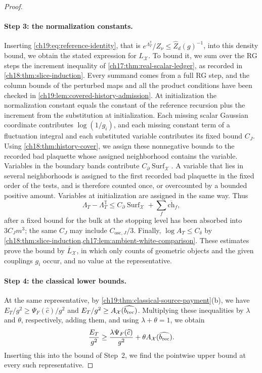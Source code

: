 \begin{proof}
\paragraph{Step 3: the normalization constants.}
Inserting \eqref{ch19:eq:reference-identity}, that is $e^{\Lambda_T^{\mathbb T}}/Z_\nu\le\widehat Z_d(g)^{-1}$, into this density bound, we obtain the stated expression for $L_{\mathcal X}$. To bound it, we sum over the RG steps the increment inequality of \cref{ch17:thm:real-scalar-ledger}, as recorded in \cref{ch18:thm:slice-induction}. Every summand comes from a full RG step, and the column bounds of the perturbed maps and all the product conditions have been checked in \cref{ch19:lem:covered-history-admission}. At initialization the normalization constant equals the constant of the reference recursion plus the increment from the substitution at initialization. Each missing scalar Gaussian coordinate contributes $\log(1/g_i)$, and each missing constant term of a fluctuation integral and each substituted variable contributes its fixed bound $C_J$. Using \cref{ch18:thm:history-cover}, we assign these nonnegative bounds to the recorded bad plaquette whose assigned neighborhood contains the variable. Variables in the boundary bands contribute $C_\partial\operatorname{Surf}_{\mathcal X}$. A variable that lies in several neighborhoods is assigned to the first recorded bad plaquette in the fixed order of the tests, and is therefore counted once, or overcounted by a bounded positive amount. Variables at initialization are assigned in the same way. Thus
\[
 \Lambda_T-\Lambda_T^{\mathbb T}\le C_\partial\operatorname{Surf}_{\mathcal X}+\sum_f\overline{\mathrm{ch}}_f,
\]
after a fixed bound for the bulk at the stopping level has been absorbed into $3C_Jm^3$; the same $C_J$ may include $C_{\mathrm{osc},J}/3$. Finally, $\log A_T\le C_\delta$ by \cref{ch18:thm:slice-induction,ch17:lem:ambient-white-comparison}. These estimates prove the bound by $\overline L_{\mathcal X}$, in which only counts of geometric objects and the given couplings $g_i$ occur, and no value at the representative.

\paragraph{Step 4: the classical lower bounds.}
At the same representative, by \cref{ch19:thm:classical-source-payment}(b), we have $E_T/g^2\ge\Psi_F(\widehat c)/g^2$ and $E_T/g^2\ge A_{\mathcal X}(\widehat{b_{\mathrm{rec}}})$. Multiplying these inequalities by $\lambda$ and $\theta$, respectively, adding them, and using $\lambda+\theta=1$, we obtain
\[
 \frac{E_T}{g^2}\ge\frac{\lambda\Psi_F(\widehat c)}{g^2}+\theta A_{\mathcal X}(\widehat{b_{\mathrm{rec}}}).
\]
Inserting this into the bound of Step~2, we find the pointwise upper bound at every such representative.


\end{proof}
